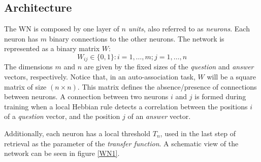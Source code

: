 \documentclass{article}
\begin{document}
\subsection{Architecture}
The WN is composed by one layer of $n$  \textit{units}, also referred to as \textit{neurons}. Each neuron has $m$ binary connections to the other neurons.
The network is represented as a binary matrix $W$:
\begin{equation}
W_{ij} \in \{0,1\} : i=1, \ldots, m ;  j=1, \ldots, n
\end{equation}
The dimensions $m$ and $n$ are given by the fixed sizes of the \textit{question} and \textit{answer} vectors, respectively. Notice that, in an auto-association task, $W$ will be a square matrix of size $(n \times n)$. 
This matrix defines the absence/presence of connections between neurons. A connection between two neurons $i$ and $j$ is formed during training when a local Hebbian rule detects a correlation between the positions $i$ of a \textit{question} vector, and the position $j$ of an \textit{answer} vector.

Additionally, each neuron has a local threshold $T_n$, used in the last step of retrieval as the parameter of the \textit{transfer function}. A schematic view of the network can be seen in figure \ref{WN1}.
\end{document}
